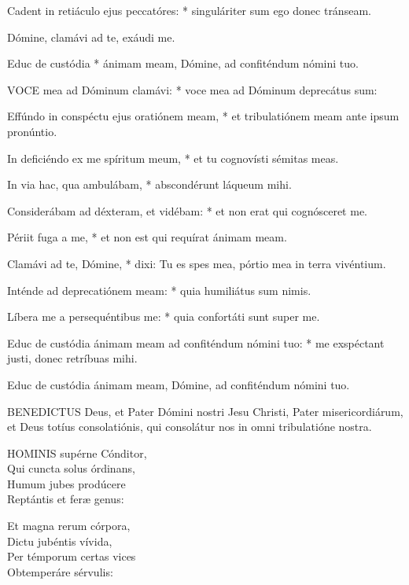 Cadent in retiáculo ejus peccatóres: * singuláriter sum ego donec tránseam.

 Dómine, clamávi ad te, exáudi me.

 Educ de custódia * ánimam meam, Dómine, ad confiténdum nómini tuo.


\lettrine[lines=2]{V}{OCE} mea ad Dóminum clamávi: * voce mea ad Dóminum deprecátus sum:

Effúndo in conspéctu ejus oratiónem meam, * et tribulatiónem meam ante ipsum pronúntio.

In deficiéndo ex me spíritum meum, * et tu cognovísti sémitas meas.

In via hac, qua ambulábam, * abscondérunt láqueum mihi.

Considerábam ad déxteram, et vidébam: * et non erat qui cognósceret me.

Périit fuga a me, * et non est qui requírat ánimam meam.

Clamávi ad te, Dómine, * dixi: Tu es spes mea, pórtio mea in terra vivéntium.

Inténde ad deprecatiónem meam: * quia humiliátus sum nimis.

Líbera me a persequéntibus me: * quia confortáti sunt super me.

Educ de custódia ánimam meam ad confiténdum nómini tuo: * me exspéctant justi, donec retríbuas mihi.

 Educ de custódia ánimam meam, Dómine, ad confiténdum nómini tuo.



\lettrine[lines=2]{B}{ENEDICTUS} Deus, et Pater Dómini nostri Jesu Christi, Pater misericordiárum, et Deus totíus consolatiónis, qui consolátur nos in omni tribulatióne nostra.


\lettrine[lines=2]{H}{OMINIS} supérne Cónditor,\\
Qui cuncta solus órdinans,\\
Humum jubes prodúcere\\
Reptántis et feræ genus:

Et magna rerum córpora,\\
Dictu jubéntis vívida,\\
Per témporum certas vices\\
Obtemperáre sérvulis:

